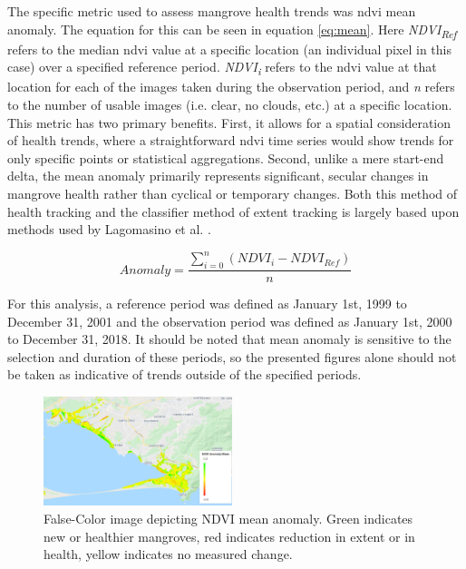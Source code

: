 The specific metric used to assess mangrove health trends was \ac{ndvi} mean anomaly. The equation for this can be seen in equation \ref{eq:mean}. Here \textit{NDVI\textsubscript{Ref}} refers to the median \ac{ndvi} value at a specific location (an individual pixel in this case) over a specified reference period. \textit{NDVI\textsubscript{i}} refers to the \ac{ndvi} value at that location for each of the images taken during the observation period, and \textit{n} refers to the number of usable images (i.e. clear, no clouds, etc.) at a specific location. This metric has two primary benefits. First, it allows for a spatial consideration of health trends, where a straightforward \ac{ndvi} time series would show trends for only specific points or statistical aggregations. Second, unlike a mere start-end delta, the mean anomaly primarily represents significant, secular changes in mangrove health rather than cyclical or temporary changes. Both this method of health tracking and the classifier method of extent tracking is largely based upon methods used by Lagomasino et al. \cite{lagomasinoMeasuringMangroveCarbon2019, goldbergGlobalDeclinesHuman2020}.

\begin{equation}
\label{eq:mean}
Anomaly = \frac{\sum_{i=0}^{n} (NDVI_i - NDVI_{Ref})}{n}
\end{equation}

For this analysis, a reference period was defined as January 1st, 1999 to December 31, 2001 and the observation period was defined as January 1st, 2000 to December 31, 2018. It should be noted that mean anomaly is sensitive to the selection and duration of these periods, so the presented figures alone should not be taken as indicative of trends outside of the specified periods. 

\begin{figure}[H] 
\centering
\includegraphics[width=0.49\textwidth]{Figures/chap4/guaratiba_anomaly.png}
\caption[False-Color image depicting NDVI mean anomaly]{False-Color image depicting NDVI mean anomaly. Green indicates new or healthier mangroves, red indicates reduction in extent or in health, yellow indicates no measured change.}
\label{fig:anomaly}
\end{figure}

